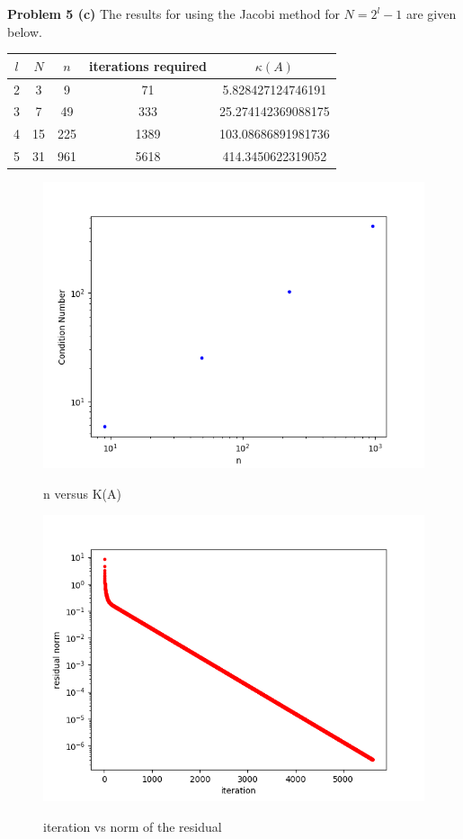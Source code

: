 \documentclass[12pt]{article}
\newcommand{\problem}[1]{\hspace{-4 ex} \large \textbf{Problem #1} }
\begin{document}
\problem{5 (c)} The results for using the Jacobi method for $N = 2^l - 1$ are given below.
\begin{center}
	\begin{tabular}{|c|c|c|c|c|}
		\hline
		$l$&$N$&$n$&iterations required&$\kappa(A)$\\ \hline
		2&3&9&71&5.828427124746191\\ \hline
		3&7&49&333&25.274142369088175\\ \hline
		4&15&225&1389&103.08686891981736\\ \hline
		5&31&961&5618&414.3450622319052\\ \hline
	\end{tabular}
\end{center}

\begin{figure}[H]
	\caption{n versus K(A)}
	\includegraphics[width=1\textwidth]{hwch7_figure_1}
	\label{5c1}
	\centering
\end{figure}

\begin{figure}[H]
	\caption{iteration vs norm of the residual}
	\includegraphics[width=1\textwidth]{hwch7_figure_2}
	\label{5c2}
	\centering
\end{figure}
\end{document}
